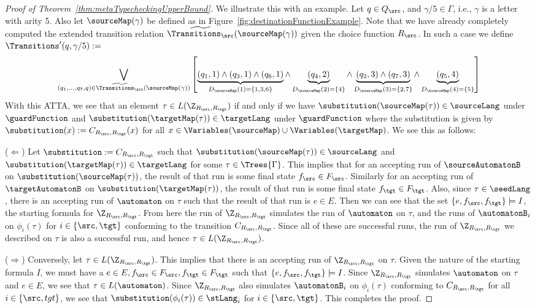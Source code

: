 \begin{proof}[Proof of Theorem~\ref{thm:metaTypecheckingUpperBound}]
  We illustrate this with an example. Let $q \in Q_\src$, and $\gamma/5 \in \Gamma$, i.e., $\gamma$ is a letter with arity 5. Also let $\sourceMap(\gamma)$ be defined as in Figure~\ref{fig:destinationFunctionExample}. Note that we have already completely computed the extended transition relation $\widetilde{\Transitions_\src}(\sourceMap(\gamma))$ given the choice function $R_\src$. In such a case we define $        \Transitions'(q, \gamma/5) :=$
  \[
  \bigvee_{(q_1, \dots, q_7, q) \in \widetilde{\Transitions_\src}(\sourceMap(\gamma))} \left[ \underbrace{(q_1, 1) \land (q_3, 1) \land (q_6, 1)}_{D_{\sourceMap}(1) = \{1, 3, 6\}} \land \underbrace{(q_4, 2)}_{D_{\sourceMap}(2) = \{4\}} \land \underbrace{(q_2, 3) \land (q_7, 3)}_{D_{\sourceMap}(3) = \{2, 7\}} \land \underbrace{(q_5, 4)}_{D_{\sourceMap}(4) = \{5\}} \right]
  \]
  With this ATTA, we see that an element $\tau \in L(\Z_{R_\src, R_\tgt})$ if and only if we have $\substitution(\sourceMap(\tau)) \in \sourceLang$ under $\guardFunction$ and $\substitution(\targetMap(\tau)) \in \targetLang$ under $\guardFunction$ where the substitution is given by $\substitution(x) := C_{R_\src, R_\tgt}(x)$ for all $x \in \Variables(\sourceMap) \cup \Variables(\targetMap)$. We see this as follows:

  ($\Leftarrow$) Let $\substitution := C_{R_\src, R_\tgt}$ such that $\substitution(\sourceMap(\tau)) \in \sourceLang$ and $\substitution(\targetMap(\tau)) \in \targetLang$ for some $\tau \in \Trees{\Gamma}$. This implies that for an accepting run of $\sourceAutomatonB$ on $\substitution(\sourceMap(\tau))$, the result of that run is some final state $f_\src \in F_\src$. Similarly for an accepting run of $\targetAutomatonB$ on $\substitution(\targetMap(\tau))$, the result of that run is some final state $f_\tgt \in F_\tgt$. Also, since $\tau \in \seedLang$, there is an accepting run of $\automaton$ on $\tau$ such that the result of that run is $e \in E$. Then we can see that the set $\{e, f_\src, f_\tgt\} \models I$, the starting formula for $\Z_{R_\src, R_\tgt}$. From here the run of $\Z_{R_\src, R_\tgt}$ simulates the run of $\automaton$ on $\tau$, and the runs of $\automatonB_i$ on $\phi_i(\tau)$ for $i \in \{\src, \tgt\}$ conforming to the transition $C_{R_\src, R_\tgt}$. Since all of these are successful runs, the run of $\Z_{R_\src, R_\tgt}$ we described on $\tau$ is also a successful run, and hence $\tau \in L(\Z_{R_\src, R_\tgt})$.

  ($\Rightarrow$) Conversely, let $\tau \in L(\Z_{R_\src, R_\tgt})$. This implies that there is an accepting run of $\Z_{R_\src, R_\tgt}$ on $\tau$. Given the nature of the starting formula $I$, we must have a $e \in E, f_\src \in F_\src, f_\tgt \in F_\tgt$ such that $\{e, f_\src, f_\tgt\} \models I$. Since $\Z_{R_\src, R_\tgt}$ simulates $\automaton$ on $\tau$ and $e \in E$, we see that $\tau \in L(\automaton)$. Since $\Z_{R_\src, R_\tgt}$ also simulates $\automatonB_i$ on $\phi_i(\tau)$ conforming to $C_{R_\src, R_\tgt}$ for all $i \in \{\src, tgt\}$, we see that $\substitution(\phi_i(\tau)) \in \stLang_i$ for $i \in \{\src, \tgt\}$. This completes the proof.


\end{proof}
